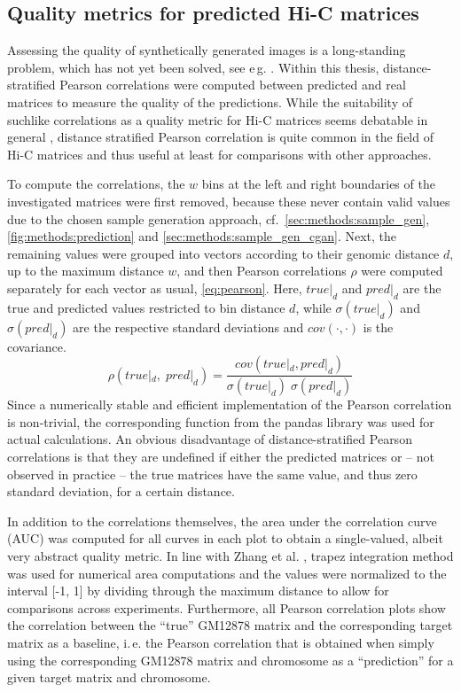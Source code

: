 \subsection{Quality metrics for predicted Hi-C matrices} \label{sec:methods:metrics}
Assessing the quality of synthetically generated images is a long-standing problem, which has not yet been solved, see e\,g. \cite[p.\,19]{Wang2020}.
Within this thesis, distance-stratified Pearson correlations were computed between predicted and real matrices to measure the quality of the predictions.
While the suitability of suchlike correlations as a quality metric for Hi-C matrices seems debatable in general \cite{Yang2017}, 
distance stratified Pearson correlation is quite common in the field of Hi-C matrices and thus useful at least for comparisons with other approaches.

To compute the correlations, the $w$ bins at the left and right boundaries of the investigated matrices were first removed, because these never contain 
valid values due to the chosen sample generation approach, 
cf.~\cref{sec:methods:sample_gen}, \cref{fig:methods:prediction} and \ref{sec:methods:sample_gen_cgan}.
Next, the remaining values were grouped into vectors according to their genomic distance $d$, up to the maximum distance $w$, 
and then Pearson correlations $\rho$ were computed separately for each vector as usual, \cref{eq:pearson}.
Here, $\mathit{true}|_d$ and $\mathit{pred}|_d$ are the true and predicted values restricted to bin distance $d$, while
$\sigma(\mathit{true}|_d)$ and $\sigma(\mathit{pred}|_d)$ are the respective standard deviations and $cov(\cdot,\cdot)$ is the covariance.
\begin{equation}
 \rho(\mathit{true}|_d, \; \mathit{pred}|_d) = \frac{cov(\mathit{true}|_d, \mathit{pred}|_d)}{\sigma(\mathit{true}|_d)\; \sigma(\mathit{pred}|_d)} \label{eq:pearson}
\end{equation}
Since a numerically stable and efficient implementation of the Pearson correlation is non-trivial, the corresponding function from the pandas library \xxx was used
for actual calculations.
An obvious disadvantage of distance-stratified Pearson correlations is that they are undefined if either the predicted matrices or -- not observed in practice -- 
the true matrices have the same value, and thus zero standard deviation, for a certain distance.

In addition to the correlations themselves, the area under the correlation curve (AUC) was computed for all curves in each plot 
to obtain a single-valued, albeit very abstract quality metric.
In line with Zhang et al. \cite{Zhang2019}, trapez integration method was used for numerical area computations
and the values were normalized to the interval [-1, 1] by dividing through the maximum distance to allow for comparisons across experiments.
Furthermore, all Pearson correlation plots show the correlation between the ``true'' GM12878 matrix and the corresponding target matrix as a baseline,
i.\,e. the Pearson correlation that is obtained when simply using the corresponding GM12878 matrix and chromosome 
as a ``prediction'' for a given target matrix and chromosome.

